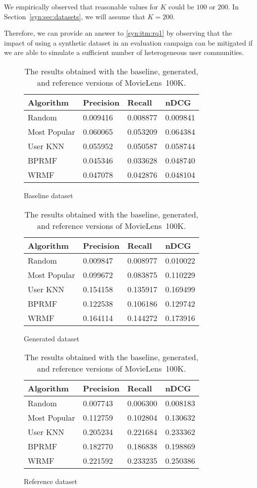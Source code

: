 We empirically observed that reasonable values for $K$ could be $100$ or $200$. In Section~\ref{syn:sec:datasets}, we will assume that $K = 200$.

Therefore, we can provide an answer to \ref{syn:itm:rq1} by observing that the impact of using a synthetic dataset in an evaluation campaign can be mitigated if we are able to simulate a sufficient number of heterogeneous user communities.

\begin{table}
\begin{subfigure}{\textwidth}
\centering
\begin{tabular}{@{}llll@{}}
\toprule
Algorithm & Precision & Recall & nDCG \\ \midrule
Random & 0.009416 & 0.008877 & 0.009841 \\
Most Popular & 0.060065 & 0.053209 & 0.064384 \\
User KNN & 0.055952 & 0.050587 & 0.058744 \\
BPRMF & 0.045346 & 0.033628 & 0.048740 \\
WRMF & 0.047078 & 0.042876 & 0.048104 \\ \bottomrule
\end{tabular}
\caption{Baseline dataset}
\bigskip
\end{subfigure}
\begin{subfigure}{\textwidth}
\centering
\begin{tabular}{@{}llll@{}}
\toprule
Algorithm & Precision & Recall & nDCG \\ \midrule
Random & 0.009847 & 0.008977 & 0.010022 \\
Most Popular & 0.099672 & 0.083875 & 0.110229 \\
User KNN & 0.154158 & 0.135917 & 0.169499 \\
BPRMF & 0.122538 & 0.106186 & 0.129742 \\
WRMF & 0.164114 & 0.144272 & 0.173916 \\ \bottomrule
\end{tabular}
\caption{Generated dataset}
\bigskip
\end{subfigure}
\begin{subfigure}{\textwidth}
\centering
\begin{tabular}{@{}llll@{}}
\toprule
Algorithm & Precision & Recall & nDCG \\ \midrule
Random & 0.007743 & 0.006300 & 0.008183 \\
Most Popular & 0.112759 & 0.102804 & 0.130632 \\
User KNN & 0.205234 & 0.221684 & 0.233362 \\
BPRMF & 0.182770 & 0.186838 & 0.198869 \\
WRMF & 0.221592 & 0.233235 & 0.250386 \\ \bottomrule
\end{tabular}
\caption{Reference dataset}
\end{subfigure}
\caption[Experimental results with the synthetic MovieLens~100K]{The results obtained with the baseline, generated, and reference versions of MovieLens~100K.}
\label{syn:tab:movielens-100k}
\end{table}

